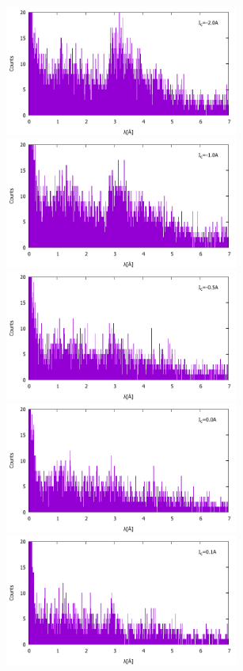 \begin{figure}[h]
\includegraphics[height=4.3cm]{resonance/results/Flipper2_RawCounts_-20A.pdf}
\includegraphics[height=4.3cm]{resonance/results/Flipper2_RawCounts_-10A.pdf}\\
\includegraphics[height=4.3cm]{resonance/results/Flipper2_RawCounts_-5A.pdf}
\includegraphics[height=4.3cm]{resonance/results/Flipper2_RawCounts_0A.pdf}\\
\includegraphics[height=4.3cm]{resonance/results/Flipper2_RawCounts_1A.pdf}

\end{figure}
